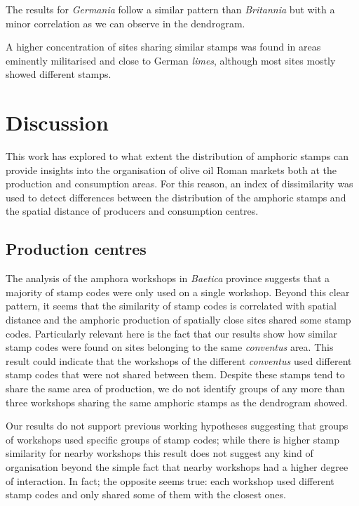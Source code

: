 \documentclass[review]{elsarticle}
\begin{document}
The results for \textit{Germania} follow a similar pattern than \textit{Britannia} but with a minor correlation as we can observe in the dendrogram.

A higher concentration of sites sharing similar stamps was found in areas eminently militarised and close to German \textit{limes}, although most sites mostly showed different stamps. 

\section{Discussion}

This work has explored to what extent the distribution of amphoric stamps can provide insights into the organisation of olive oil Roman markets both at the production and consumption areas. For this reason, an index of dissimilarity was used to detect differences between the distribution of the amphoric stamps and the spatial distance of producers and consumption centres. 


\subsection{Production centres}

The analysis of the amphora workshops in \textit{Baetica} province suggests that a majority of stamp codes were only used on a single workshop. Beyond this clear pattern, it seems that the similarity of stamp codes is correlated with spatial distance and the amphoric production of spatially close sites shared some stamp codes. Particularly relevant here is the fact that our results show how similar stamp codes were found on sites belonging to the same \textit{conventus} area. This result could indicate that the workshops of the different \textit{conventus} used different stamp codes that were not shared between them. Despite these stamps tend to share the same area of production, we do not identify groups of any more than three workshops sharing the same amphoric stamps as the dendrogram showed. 

Our results do not support previous working hypotheses suggesting that groups of workshops used specific groups of stamp codes; while there is higher stamp similarity for nearby workshops this result does not suggest any kind of organisation beyond the simple fact that nearby workshops had a higher degree of interaction. In fact; the opposite seems true: each workshop used different stamp codes and only shared some of them with the closest ones. 
\end{document}
